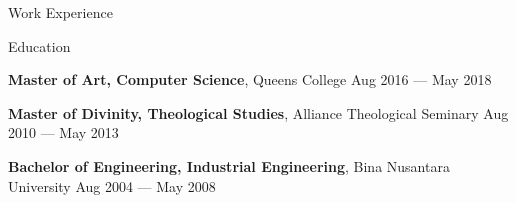 \documentclass{resume} %
\begin{document}
\begin{rSection}{Work Experience}

\begin{rSection}{Education}

\textbf{Master of Art, Computer Science}, Queens College \hfill {Aug 2016 --- May 2018}

\textbf{Master of Divinity, Theological Studies}, Alliance Theological Seminary \hfill {Aug 2010 --- May 2013}

\textbf{Bachelor of Engineering, Industrial Engineering}, Bina Nusantara University \hfill {Aug 2004 --- May 2008}

\end{rSection}





\end{rSection}
\end{document}
